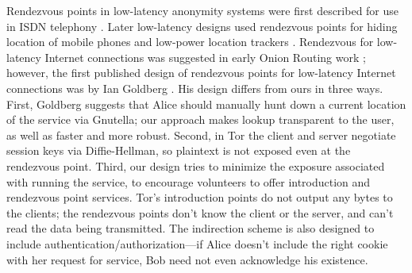 \documentclass[times,10pt,twocolumn]{article}
\begin{document}
Rendezvous points in low-latency anonymity systems were first
described for use in ISDN telephony \cite{jerichow-jsac98,isdn-mixes}.
Later low-latency designs used rendezvous points for hiding location
of mobile phones and low-power location trackers
\cite{federrath-ih96,reed-protocols97}.  Rendezvous for low-latency
Internet connections was suggested in early Onion Routing work
\cite{or-ih96}; however, the first published design of rendezvous
points for low-latency Internet connections was by Ian Goldberg
\cite{ian-thesis}. His design differs from
ours in three ways. First, Goldberg suggests that Alice should manually
hunt down a current location of the service via Gnutella; our approach
makes lookup transparent to the user, as well as faster and more robust.
Second, in Tor the client and server negotiate session keys
via Diffie-Hellman, so plaintext is not exposed even at the rendezvous point. Third,
our design tries to minimize the exposure associated with running the
service, to encourage volunteers to offer introduction and rendezvous
point services. Tor's introduction points do not output any bytes to the
clients; the rendezvous points don't know the client or the server,
and can't read the data being transmitted. The indirection scheme is
also designed to include authentication/authorization---if Alice doesn't
include the right cookie with her request for service, Bob need not even
acknowledge his existence.

%
%
%
%
%
\end{document}

